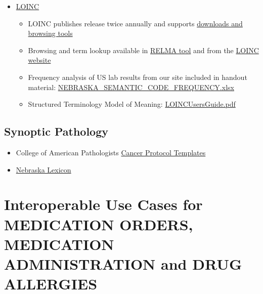 \documentclass[
]{journal}
\providecommand{\tightlist}{%
  \setlength{\itemsep}{0pt}\setlength{\parskip}{0pt}}
\begin{document}
\begin{itemize}
\tightlist
\item
  \href{https://loinc.org/}{LOINC}

  \begin{itemize}
  \tightlist
  \item
    LOINC publishes release twice annually and supports \href{https://loinc.org/search/}{downloads and browsing tools}
  \item
    Browsing and term lookup available in \href{https://loinc.org/relma/}{RELMA tool} and from the \href{https://loinc.org/search/}{LOINC website}
  \item
    Frequency analysis of US lab results from our site included in handout material: \href{https://github.com/UNMC-CRANE/AMIA_Workshop_May_2022/blob/main/Handouts/NEBRASKA_SEMANTIC_CODE_FREQUENCYfinal.xlsx}{NEBRASKA\_SEMANTIC\_CODE\_FREQUENCY.xlsx}
  \item
    Structured Terminology Model of Meaning: \href{https://github.com/UNMC-CRANE/AMIA_Workshop_May_2022/blob/main/Handouts/LOINCUsersGuide.pdf}{LOINCUsersGuide.pdf}
  \end{itemize}
\end{itemize}

\hypertarget{synoptic-pathology}{%
\subsection{Synoptic Pathology}\label{synoptic-pathology}}

\begin{itemize}
\tightlist
\item
  College of American Pathologists \href{https://www.cap.org/protocols-and-guidelines/cancer-reporting-tools/cancer-protocol-templates}{Cancer Protocol Templates}
\item
  \href{https://www.unmc.edu/pathology-research/bioinformatics/campbell/tdc.html}{Nebraska Lexicon}
\end{itemize}

\hypertarget{interoperable-use-cases-for-medication-orders-medication-administration-and-drug-allergies}{%
\section{Interoperable Use Cases for MEDICATION ORDERS, MEDICATION ADMINISTRATION and DRUG ALLERGIES}\label{interoperable-use-cases-for-medication-orders-medication-administration-and-drug-allergies}}
\end{document}

